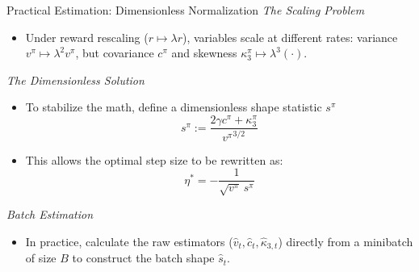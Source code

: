 \documentclass[9pt]{beamer}
\begin{document}
\begin{frame}{Practical Estimation: Dimensionless Normalization}
    \emph{The Scaling Problem}
    \begin{itemize}
        \item Under reward rescaling ($r \mapsto \lambda r$), variables scale at different rates: variance $v^\pi \mapsto \lambda^2 v^\pi$, but covariance $c^\pi$ and skewness $\kappa_3^\pi \mapsto \lambda^3 (\cdot)$.
    \end{itemize}

    \vspace{0.5em}
    \emph{The Dimensionless Solution}
    \begin{itemize}
        \item To stabilize the math, define a dimensionless shape statistic $s^\pi$
        \begin{equation*}
            s^\pi := \frac{2\gamma c^\pi + \kappa_3^\pi}{{v^\pi}^{3/2}}
        \end{equation*}
        \item This allows the optimal step size to be rewritten as:
        \begin{equation*}
            \eta^* = -\frac{1}{\sqrt{v^\pi}\,s^\pi}
        \end{equation*}
    \end{itemize}

    \vspace{0.5em}
    \emph{Batch Estimation}
    \begin{itemize}
        \item In practice, calculate the raw estimators ($\hat{v}_t, \hat{c}_t, \hat{\kappa}_{3,t}$) directly from a minibatch of size $B$ to construct the batch shape $\hat{s}_t$.
    \end{itemize}
\end{frame}
\end{document}
